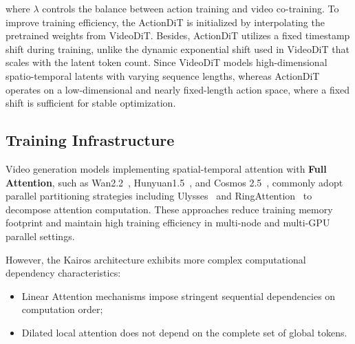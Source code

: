 where $\lambda$ controls the balance between action training and video co-training. To improve training efficiency, the ActionDiT is initialized by interpolating the pretrained weights from VideoDiT. Besides, ActionDiT utilizes a fixed timestamp shift during training, unlike the dynamic exponential shift used in VideoDiT that scales with the latent token count. Since VideoDiT models high-dimensional spatio-temporal latents with varying sequence lengths, whereas ActionDiT operates on a low-dimensional and nearly fixed-length action space, where a fixed shift is sufficient for stable optimization.








\subsection{Training Infrastructure}

Video generation models implementing spatial-temporal attention with \textbf{Full Attention}, such as Wan2.2~\cite{wan2025}, Hunyuan1.5~\cite{hyworld2025}, and Cosmos 2.5~\cite{nvidia2025worldsimulationvideofoundation}, commonly adopt parallel partitioning strategies including Ulysses~\cite{jacobs2023deepspeedulyssesoptimizationsenabling} and RingAttention~\cite{liu2023ringattentionblockwisetransformers} to decompose attention computation. These approaches reduce training memory footprint and maintain high training efficiency in multi-node and multi-GPU parallel settings.

However, the Kairos architecture exhibits more complex computational dependency characteristics:
\begin{itemize}
    \item Linear Attention mechanisms impose stringent sequential dependencies on computation order;
    \item Dilated local attention does not depend on the complete set of global tokens.
\end{itemize}

